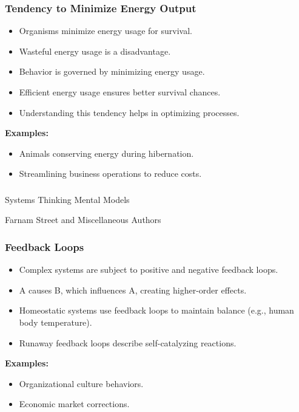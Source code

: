 \begin{frame}[fragile]\frametitle{Tendency to Minimize Energy Output}
\begin{itemize}
    \item Organisms minimize energy usage for survival.
    \item Wasteful energy usage is a disadvantage.
    \item Behavior is governed by minimizing energy usage.
    \item Efficient energy usage ensures better survival chances.
    \item Understanding this tendency helps in optimizing processes.
\end{itemize}
\textbf{Examples:}
\begin{itemize}
    \item Animals conserving energy during hibernation.
    \item Streamlining business operations to reduce costs.
\end{itemize}
\end{frame}

\begin{frame}[fragile]\frametitle{}
\begin{center}
{\Large Systems Thinking Mental Models}

{\tiny Farnam Street and Miscellaneous Authors }


\end{center}
\end{frame}

\begin{frame}[fragile]\frametitle{Feedback Loops}
\begin{itemize}
    \item Complex systems are subject to positive and negative feedback loops.
    \item A causes B, which influences A, creating higher-order effects.
    \item Homeostatic systems use feedback loops to maintain balance (e.g., human body temperature).
    \item Runaway feedback loops describe self-catalyzing reactions.
\end{itemize}
\textbf{Examples:}
\begin{itemize}
    \item Organizational culture behaviors.
    \item Economic market corrections.
\end{itemize}
\end{frame}

